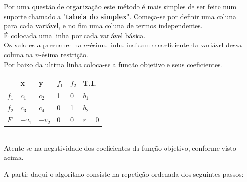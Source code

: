 \documentclass[]{report}
\begin{document}
\begin{minipage}{\textwidth}
Por uma questão de organização este método é mais simples de ser feito num suporte chamado a "\textbf{tabela do simplex}". 
Começa-se por definir uma coluna para cada variável, e no fim uma coluna de termos independentes.\\
É colocada uma linha por cada variável básica.\\
Os valores a preencher na $n$-ésima linha indicam o coeficiente da variável dessa coluna na $n$-ésima restrição.\\
Por baixo da ultima linha coloca-se a função objetivo e seus coeficientes.\\
\begin{tabular}{l|llll|l}
      & x & y & $f_1$ & $f_2$ & T.I.\\\hline
$f_1$ & $c_1$ & $c_2$ & 1  & 0  & $b_1$\\
$f_2$ & $c_3$ & $c_4$ & 0  & 1  & $b_2$\\\hline
$F$   & $-v_1$ & $-v_2$ & 0  & 0  & $r=0$
\end{tabular}\\
Atente-se na negatividade dos coeficientes da função objetivo, conforme visto acima.\\[0.3cm]
\end{minipage}
A partir daqui o algoritmo consiste na repetição ordenada dos seguintes passos:
\end{document}
